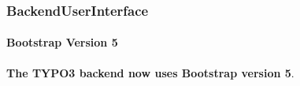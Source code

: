 %

\begin{frame}[fragile]
	\frametitle{BackendUserInterface}
	\framesubtitle{Bootstrap Version 5}

	\small
		\textbf{The TYPO3 backend now uses Bootstrap version 5}.
	\normalsize

\end{frame}

